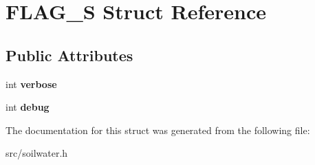 \hypertarget{struct_f_l_a_g___s}{\section{F\-L\-A\-G\-\_\-\-S Struct Reference}
\label{struct_f_l_a_g___s}
}
\subsection*{Public Attributes}
\begin{DoxyCompactItemize}
\item 
\hypertarget{struct_f_l_a_g___s_af8b2a7a4619ddd56ba0ae233e707b062}{int {\bfseries verbose}}\label{struct_f_l_a_g___s_af8b2a7a4619ddd56ba0ae233e707b062}

\item 
\hypertarget{struct_f_l_a_g___s_a1c379aa0bf14e19587c60bfbce75a1dd}{int {\bfseries debug}}\label{struct_f_l_a_g___s_a1c379aa0bf14e19587c60bfbce75a1dd}

\end{DoxyCompactItemize}


The documentation for this struct was generated from the following file\-:\begin{DoxyCompactItemize}
\item 
src/soilwater.\-h\end{DoxyCompactItemize}
